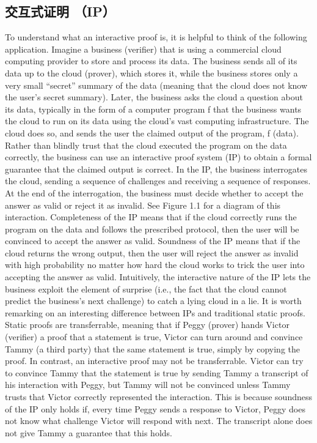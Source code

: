 \subsection{交互式证明 （IP）}
To understand what an interactive proof is, it is helpful to think of the following application. Imagine a business (verifier) that is using a commercial cloud computing provider to store and process its data. The business sends all of its data up to the cloud (prover), which stores it, while the business stores only a very small “secret” summary of the data (meaning that the cloud does not know the user’s secret summary). Later, the business asks the cloud a question about its data, typically in the form of a computer program f that the business wants the cloud to run on its data using the cloud’s vast computing infrastructure. The cloud does so, and sends the user the claimed output of the program, f (data). Rather than blindly trust that the cloud executed the program on the data correctly, the business can use an interactive proof system (IP) to obtain a formal guarantee that the claimed output is correct.
In the IP, the business interrogates the cloud, sending a sequence of challenges and receiving a sequence of responses. At the end of the interrogation, the business must decide whether to accept the answer as valid or reject it as invalid. See Figure 1.1 for a diagram of this interaction.
Completeness of the IP means that if the cloud correctly runs the program on the data and follows the prescribed protocol, then the user will be convinced to accept the answer as valid. Soundness of the IP means that if the cloud returns the wrong output, then the user will reject the answer as invalid with high probability no matter how hard the cloud works to trick the user into accepting the answer as valid. Intuitively, the interactive nature of the IP lets the business exploit the element of surprise (i.e., the fact that the cloud cannot predict the business’s next challenge) to catch a lying cloud in a lie.
It is worth remarking on an interesting difference between IPs and traditional static proofs. Static proofs are transferrable, meaning that if Peggy (prover) hands Victor (verifier) a proof that a statement is true, Victor can turn around and convince Tammy (a third party) that the same statement is true, simply by copying the proof. In contrast, an interactive proof may not be transferrable. Victor can try to convince Tammy that the statement is true by sending Tammy a transcript of his interaction with Peggy, but Tammy will not be convinced unless Tammy trusts that Victor correctly represented the interaction. This is because soundness of the IP only holds if, every time Peggy sends a response to Victor, Peggy does not know what challenge Victor will respond with next. The transcript alone does not give Tammy a guarantee that this holds.

